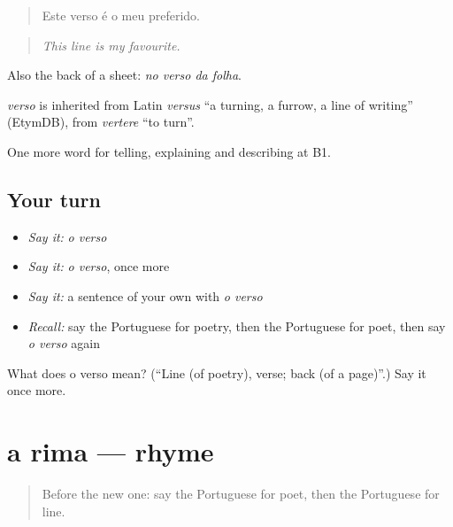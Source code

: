 \begin{quote}
Este verso é o meu preferido.
\end{quote}

\begin{quote}
\emph{This line is my favourite.}
\end{quote}

Also the back of a sheet: \emph{no verso da folha}.

\begin{cousinweb}
\emph{verso} is inherited from Latin \emph{versus} \textquotedblleft{}a turning, a furrow, a line of writing\textquotedblright{} (EtymDB), from \emph{vertere} \textquotedblleft{}to turn\textquotedblright{}.
\end{cousinweb}

\begin{grammarlens}[title={What you've built}]
One more word for telling, explaining and describing at B1.
\end{grammarlens}

\subsection*{Your turn}
\begin{itemize}
\raggedright
  \item \emph{Say it:} \emph{o verso}
  \item \emph{Say it:} \emph{o verso}, once more
  \item \emph{Say it:} a sentence of your own with \emph{o verso}
  \item \emph{Recall:} say the Portuguese for poetry, then the Portuguese for poet, then say \emph{o verso} again
\end{itemize}

\begin{tcolorbox}[breakable,colback=teal!4,colframe=teal!35!black,title={Before you move on}]
What does o verso mean? (\textquotedblleft{}Line (of poetry), verse; back (of a page)\textquotedblright{}.) Say it once more.
\end{tcolorbox}
\section[a rima]{a rima — rhyme}

\label{lesson:PT-C524-rima}



\begin{quote}
Before the new one: say the Portuguese for poet, then the Portuguese for line.
\end{quote}

